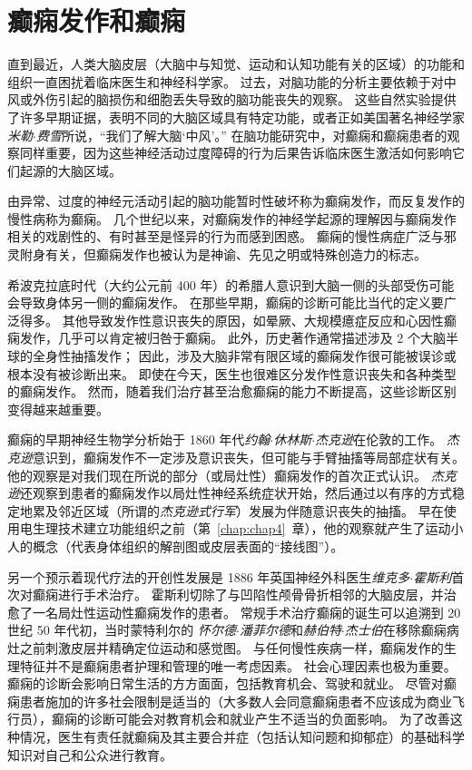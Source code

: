 \chapter{癫痫发作和癫痫} \label{chap:chap58}

直到最近，人类大脑皮层（大脑中与知觉、运动和认知功能有关的区域）的功能和组织一直困扰着临床医生和神经科学家。
过去，对脑功能的分析主要依赖于对中风或外伤引起的脑损伤和细胞丢失导致的脑功能丧失的观察。
这些自然实验提供了许多早期证据，表明不同的大脑区域具有特定功能，或者正如美国著名神经学家\textit{米勒$\cdot$费雪}所说，“我们了解大脑‘中风’。”
在脑功能研究中，对癫痫和癫痫患者的观察同样重要，因为这些神经活动过度障碍的行为后果告诉临床医生激活如何影响它们起源的大脑区域。


由异常、过度的神经元活动引起的脑功能暂时性破坏称为癫痫发作，而反复发作的慢性病称为癫痫。
几个世纪以来，对癫痫发作的神经学起源的理解因与癫痫发作相关的戏剧性的、有时甚至是怪异的行为而感到困惑。
癫痫的慢性病症广泛与邪灵附身有关，但癫痫发作也被认为是神谕、先见之明或特殊创造力的标志。


希波克拉底时代（大约公元前 400 年）的希腊人意识到大脑一侧的头部受伤可能会导致身体另一侧的癫痫发作。
在那些早期，癫痫的诊断可能比当代的定义要广泛得多。
其他导致发作性意识丧失的原因，如晕厥、大规模癔症反应和心因性癫痫发作，几乎可以肯定被归咎于癫痫。
此外，历史著作通常描述涉及 2 个大脑半球的全身性抽搐发作；
因此，涉及大脑非常有限区域的癫痫发作很可能被误诊或根本没有被诊断出来。
即使在今天，医生也很难区分发作性意识丧失和各种类型的癫痫发作。
然而，随着我们治疗甚至治愈癫痫的能力不断提高，这些诊断区别变得越来越重要。


癫痫的早期神经生物学分析始于 1860 年代\textit{约翰$\cdot$休林斯$\cdot$杰克逊}在伦敦的工作。
\textit{杰克逊}意识到，癫痫发作不一定涉及意识丧失，但可能与手臂抽搐等局部症状有关。
他的观察是对我们现在所说的部分（或局灶性）癫痫发作的首次正式认识。
\textit{杰克逊}还观察到患者的癫痫发作以局灶性神经系统症状开始，然后通过以有序的方式稳定地累及邻近区域（所谓的\textit{杰克逊式行军}）发展为伴随意识丧失的抽搐。
早在使用电生理技术建立功能组织之前（第~\ref{chap:chap4}~章），他的观察就产生了运动小人的概念（代表身体组织的解剖图或皮层表面的“接线图”）。


另一个预示着现代疗法的开创性发展是 1886 年英国神经外科医生\textit{维克多$\cdot$霍斯利}首次对癫痫进行手术治疗。
霍斯利切除了与凹陷性颅骨骨折相邻的大脑皮层，并治愈了一名局灶性运动性癫痫发作的患者。
常规手术治疗癫痫的诞生可以追溯到 20 世纪 50 年代初，当时蒙特利尔的 \textit{怀尔德$\cdot$潘菲尔德}和\textit{赫伯特$\cdot$杰士伯}在移除癫痫病灶之前刺激皮层并精确定位运动和感觉图。
与任何慢性疾病一样，癫痫发作的生理特征并不是癫痫患者护理和管理的唯一考虑因素。
社会心理因素也极为重要。
癫痫的诊断会影响日常生活的方方面面，包括教育机会、驾驶和就业。
尽管对癫痫患者施加的许多社会限制是适当的（大多数人会同意癫痫患者不应该成为商业飞行员），癫痫的诊断可能会对教育机会和就业产生不适当的负面影响。
为了改善这种情况，医生有责任就癫痫及其主要合并症（包括认知问题和抑郁症）的基础科学知识对自己和公众进行教育。



